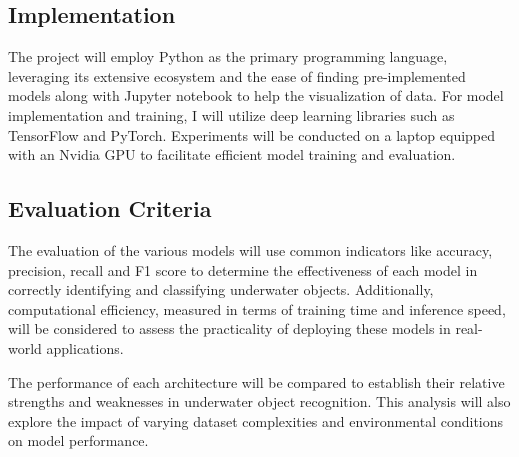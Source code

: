 \subsection{Implementation}

The project will employ Python as the primary programming language,
leveraging its extensive ecosystem and the ease of finding pre-implemented
models along with Jupyter notebook to help the visualization of data.
For model implementation and training, I will utilize deep learning
libraries such as TensorFlow and PyTorch.
Experiments will be conducted on a laptop equipped with an Nvidia GPU
to facilitate efficient model training and evaluation.

\subsection{Evaluation Criteria}

The evaluation of the various models will use common indicators like accuracy,
precision, recall and F1 score to determine the effectiveness of each model
in correctly identifying and classifying underwater objects.
Additionally, computational efficiency, measured in terms of training time
and inference speed, will be considered to assess the practicality
of deploying these models in real-world applications.

The performance of each architecture will be compared to establish
their relative strengths and weaknesses in underwater object recognition.
This analysis will also explore the impact of varying dataset complexities
and environmental conditions on model performance.

\FloatBarrier